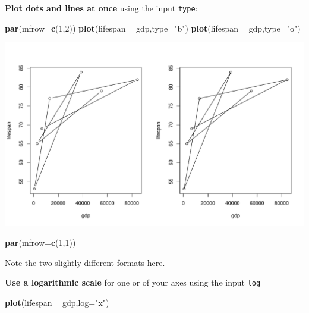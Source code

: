 \documentclass[
]{book}
\newenvironment{Shaded}{\begin{snugshade}}{\end{snugshade}}
\newcommand{\DataTypeTok}[1]{\textcolor[rgb]{0.13,0.29,0.53}{#1}}
\newcommand{\DecValTok}[1]{\textcolor[rgb]{0.00,0.00,0.81}{#1}}
\newcommand{\KeywordTok}[1]{\textcolor[rgb]{0.13,0.29,0.53}{\textbf{#1}}}
\newcommand{\NormalTok}[1]{#1}
\newcommand{\OperatorTok}[1]{\textcolor[rgb]{0.81,0.36,0.00}{\textbf{#1}}}
\newcommand{\StringTok}[1]{\textcolor[rgb]{0.31,0.60,0.02}{#1}}
\begin{document}
\textbf{Plot dots and lines at once} using the input \texttt{type}:

\begin{Shaded}
\begin{Highlighting}[]
\KeywordTok{par}\NormalTok{(}\DataTypeTok{mfrow=}\KeywordTok{c}\NormalTok{(}\DecValTok{1}\NormalTok{,}\DecValTok{2}\NormalTok{))}
\KeywordTok{plot}\NormalTok{(lifespan }\OperatorTok{~}\StringTok{ }\NormalTok{gdp,}\DataTypeTok{type=}\StringTok{"b"}\NormalTok{)}
\KeywordTok{plot}\NormalTok{(lifespan }\OperatorTok{~}\StringTok{ }\NormalTok{gdp,}\DataTypeTok{type=}\StringTok{"o"}\NormalTok{)}
\end{Highlighting}
\end{Shaded}

\includegraphics{figures/unnamed-chunk-98-1.pdf}

\begin{Shaded}
\begin{Highlighting}[]
\KeywordTok{par}\NormalTok{(}\DataTypeTok{mfrow=}\KeywordTok{c}\NormalTok{(}\DecValTok{1}\NormalTok{,}\DecValTok{1}\NormalTok{))}
\end{Highlighting}
\end{Shaded}

Note the two slightly different formats here.

\textbf{Use a logarithmic scale} for one or of your axes using the input \texttt{log}

\begin{Shaded}
\begin{Highlighting}[]
\KeywordTok{plot}\NormalTok{(lifespan }\OperatorTok{~}\StringTok{ }\NormalTok{gdp,}\DataTypeTok{log=}\StringTok{"x"}\NormalTok{)}
\end{Highlighting}
\end{Shaded}
\end{document}
